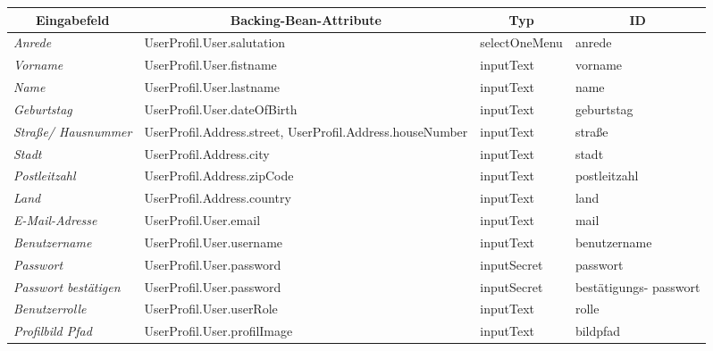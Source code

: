 \begin{itemize}
				\begin{center}
					\begin{longtable}{|p{3cm} |p{5cm} | p{4cm}|p{3cm}|}
						
						\hline \multicolumn{1}{|c|}{\textbf{Eingabefeld}} & \multicolumn{1}{|c|}{\textbf{Backing-Bean-Attribute}} & \multicolumn{1}{|c|}{\textbf{Typ}}  &  \multicolumn{1}{|c|}{\textbf{ID}} \\ \hline
						\endfirsthead
						\hline
						\endlastfoot
						\textit{Anrede} & UserProfil.User.salutation & selectOneMenu & anrede \\ \hline
						\textit{Vorname} & UserProfil.User.fistname & inputText & vorname \\ \hline
						\textit{Name} & UserProfil.User.lastname & inputText & name \\ \hline
						\textit{Geburtstag } & UserProfil.User.dateOfBirth & inputText & geburtstag \\ \hline
						\textit{Straße/ Hausnummer} & UserProfil.Address.street, UserProfil.Address.houseNumber  & inputText & straße\\ \hline
						\textit{Stadt} & UserProfil.Address.city & inputText & stadt \\ \hline
						\textit{Postleitzahl} & UserProfil.Address.zipCode & inputText & postleitzahl \\ \hline
						\textit{Land} & UserProfil.Address.country & inputText & land \\ \hline
						\textit{E-Mail-Adresse} & UserProfil.User.email & inputText & mail\\ \hline
						\textit{Benutzername} & UserProfil.User.username & inputText & benutzername \\ \hline
						\textit{Passwort} & UserProfil.User.password  & inputSecret & passwort \\ \hline
						\textit{Passwort bestätigen} & UserProfil.User.password & inputSecret & bestätigungs- passwort \\ \hline
						\textit{Benutzerrolle} & UserProfil.User.userRole & inputText & rolle \\ \hline
						\textit{Profilbild Pfad} & UserProfil.User.profilImage & inputText & bildpfad \\ \hline
					\end{longtable}
				\end{center}
				
				\begin{center}
					\begin{longtable}{|p{3cm} |p{8cm} | p{5cm}|}
						

\end{longtable}
\end{center}
\end{itemize}
